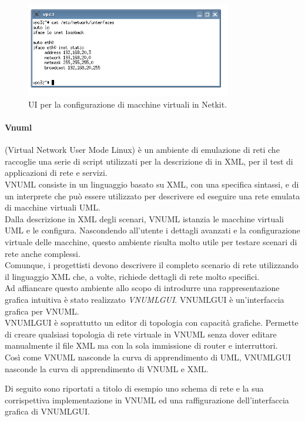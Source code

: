 \begin{figure}[!ht]
	\centering
	\includegraphics[width=9cm]{images/netkit_gui.png}
	\caption{UI per la configurazione di macchine virtuali in Netkit.}
	\label{figura:netkit_gui}
\end{figure}

\paragraph{Vnuml}\cite{VNUMLT} (Virtual Network User Mode Linux) è un ambiente di emulazione di reti che raccoglie una serie di script utilizzati per la descrizione di \testbed{} in XML, per il test di applicazioni di rete e servizi.\\
VNUML consiste in un linguaggio basato su XML, con una specifica sintassi, e di un interprete che può essere utilizzato per descrivere ed eseguire una rete emulata di macchine virtuali UML.\\
Dalla descrizione in XML degli scenari, VNUML istanzia le macchine virtuali UML e le configura. Nascondendo all'utente i dettagli avanzati e la configurazione virtuale delle macchine, questo ambiente risulta molto utile per testare scenari di rete anche complessi.\\Comunque, i progettisti devono descrivere il completo scenario di rete utilizzando il linguaggio XML che, a volte, richiede dettagli di rete molto specifici.\\
Ad affiancare questo ambiente allo scopo di introdurre una rappresentazione grafica intuitiva è stato realizzato \textit{VNUMLGUI}\cite{VNUMLGUI}. VNUMLGUI è un'interfaccia grafica per VNUML.\\
VNUMLGUI è soprattutto un editor di topologia con capacità grafiche. Permette di creare qualsiasi topologia di rete virtuale in VNUML senza dover editare manualmente il file XML ma con la sola immissione di router e interruttori.\\
Così come VNUML nasconde la curva di apprendimento di UML, VNUMLGUI nasconde la curva di apprendimento di VNUML e XML.

Di seguito sono riportati a titolo di esempio uno schema di rete e la sua corrispettiva implementazione in VNUML ed una raffigurazione dell'interfaccia grafica di VNUMLGUI.


